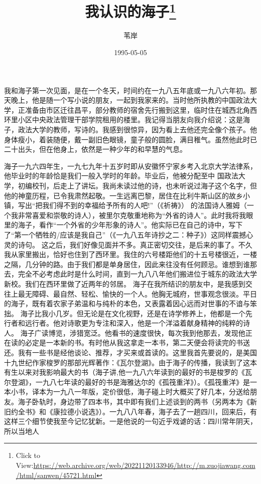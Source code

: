 \documentclass{article}
\title{我认识的海子\footnote{Click to View:\url{https://web.archive.org/web/20221120133946/http://m.zuojiawang.com/html/sanwen/45721.html}}}
\author{苇岸}
\date{1995-05-05}
\begin{document}

\maketitle


\Large

﻿我和海子第一次见面，是在一个冬天，时间约在一九八五年底或一九八六年初。那天晚上，他是随一个写小说的朋友，一起到我家来的。当时他所执教的中国政法大学，正准备由市区迁往昌平，部分教师的宿舍先行搬到这里，临时住在城西北角西环里小区中央政法管理干部学院租用的楼里。我记得当朋友向我介绍说：这是海子，政法大学的教师，写诗的。我感到很惊异，因为看上去他还完全像个孩子。他身体瘦小，着装随便，戴一副旧色眼镜，童子般的圆脸，满目稚气。虽然他此时已二十出头，但在他身上，依然是一种少年的和早慧的气息。
 
海子一九六四年生，一九七九年十五岁时即从安徽怀宁家乡考入北京大学法律系，他毕业时的年龄恰是我们一般入学时的年龄。毕业后，他被分配至中
\newpage
国政法大学，初编校刊，后走上了讲坛。我尚未读过他的诗，也未听说过海子这个名字，但他的神童历程，已令我肃然起敬。一生远离巴黎，居住在比利牛斯山区的故乡小镇，写出“把我们得不到的幸福给予所有的人吧!”（《祈祷》） 的法国诗人雅姆（一个我非常喜爱和崇敬的诗人），被里尔克敬重地称为“外省的诗人”。此时我将我眼里的海子，看作“一个外省的少年形象的诗人”。他实际已在自己的诗中，写下了“第一个牺牲的/应该是我自己”（《一九八五年诗抄之二：种子》）这同样震撼心灵的诗句。
这之后，我们好像见面并不多。真正密切交往，是后来的事了。不久我从家里搬出，恰好也住到了西环里。我住的六号楼距他们的十五号楼很近，一楼之隔，几分钟的路。由于我们都是单身居住，因此来往没有任何顾忌。谁想到谁那去，完全不必考虑此时是什么时间，直到一九八八年他们搬进位于城东的政法大学新校。我们在西环里做了近两年的邻居。
海子在我所结识的朋友中，是我感到交往上最无障碍、最自然、轻松、愉快的一个人。他胸无城府，世事观念很淡。平日的海子，既有着农家子弟温和与纯朴的本色，又表露着因心远而对世事的不谙与笨
\newpage
拙。
海子比我小几岁。但无论是在文化视野，还是在诗学修养上，他都是一个先行者和远行者。他对诗歌更为专注和深入，他是一个洋溢着献身精神的纯粹的诗人。
海子广读博览，涉猎宽泛。他看书的速度很快，每次我到他那去，发现他正在读的必定是一本新的书。有时他从我这拿走一本书，第二天便会将读完的书送还。我有一些书是经他谈论、推荐，才买来或首读的。这里我首先要说的，是美国十九世纪作家梭罗的那部光辉著作：《瓦尔登湖》。由于海子的传播，我读到了这本有生以来对我影响最大的书（海子讲,他一九八六年读到的最好的书是梭罗的《瓦尔登湖》，一九八七年读的最好的书是海雅达尔的《孤筏重洋》）。《孤筏重洋》是一本小书，译本为一九八一年版，定价很低，海子碰上时大概买了好几本，分送给朋友。海子卧轨时，身边带了四本书，其中即有我们上述谈到的两书（另两本为《新旧约全书》和《康拉德小说选》）。一九八八年春，海子去了一趟四川，回来后，有这样三个细节使我至今记忆犹新。一是他说的一句近乎戏谑的话：四川常年阴天，所以当地人
\end{document}

